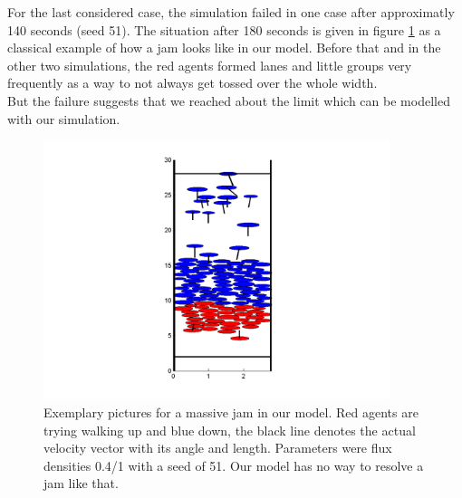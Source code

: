 \noi For the last considered case, the simulation failed in one case after approximatly 140 seconds (seed 51). The situation after 180 seconds is given in figure \ref{fig:up1down03seed51} as a classical example of how a jam looks like in our model. Before that and in the other two simulations, the red agents formed lanes and little groups very frequently as a way to not always get tossed over the whole width.\\
But the failure suggests that we reached about the limit which can be modelled with our simulation.
\begin{figure}[h!]
	\centering
		\includegraphics[width=0.90\textwidth]{pictures/up1down04seed51.png}
	\caption{Exemplary pictures for a massive jam in our model. Red agents are trying walking up and blue down, the black line denotes the actual velocity vector with its angle and length. Parameters were flux densities 0.4/1 with a seed of 51. Our model has no way to resolve a jam like that.}
	\label{fig:up1down03seed51}
\end{figure}

